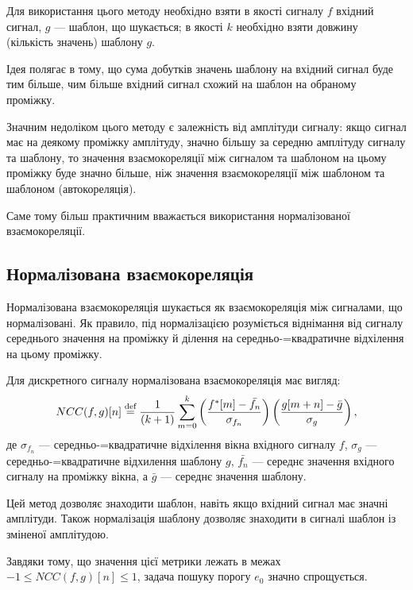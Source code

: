         Для використання цього методу необхідно взяти в якості сигналу $f$ вхідний сигнал, $g$ --- шаблон, що
        шукається; в якості $k$ необхідно взяти довжину (кількість значень) шаблону $g$.

        Ідея полягає в тому, що сума добутків значень шаблону на вхідний сигнал буде тим більше, чим більше вхідний
        сигнал схожий на шаблон на обраному проміжку.

        Значним недоліком цього методу є залежність від амплітуди сигналу: якщо сигнал має на деякому проміжку
        амплітуду, значно більшу за середню амплітуду сигналу та шаблону, то значення взаємокореляції між сигналом та
        шаблоном на цьому проміжку буде значно більше, ніж значення взаємокореляції між шаблоном та шаблоном
        (автокореляція).

        Саме тому більш практичним вважається використання нормалізованої взаємокореляції.
    \subsection{Нормалізована взаємокореляція}
        Нормалізована взаємокореляція шукається як взаємокореляція між сигналами, що нормалізовані.
        Як правило, під нормалізацією розуміється віднімання від сигналу середнього значення на проміжку й ділення на
        середньо-=квадратичне відхілення на цьому проміжку.

        Для дискретного сигналу нормалізована взаємокореляція має вигляд:
        \begin{equation}
            NCC(f,g)[ n ] \stackrel{\text{def}}{=} \frac{1}{\left(k+1\right)} \sum\limits_{m=0}^{k} \left(\frac{f^*[m] -\bar{f_n}}{\sigma_{f_n}}\right) \left(\frac{g[ m + n ]-\bar{g}}{\sigma_g}\right),
        \end{equation}
        де $\sigma_{f_n}$ --- середньо-=квадратичне відхілення вікна вхідного сигналу $f$, $\sigma_g$ ---
        середньо-=квадратичне відхилення шаблону $g$, $\bar{f_n}$ --- середнє значення вхідного сигналу на проміжку
        вікна, а $\bar{g}$ --- середнє значення шаблону.

        Цей метод дозволяє знаходити шаблон, навіть якщо вхідний сигнал має значні  амплітуди.
        Також нормалізація шаблону дозволяє знаходити в сигналі шаблон із зміненої амплітудою.

        Завдяки тому, що значення цієї метрики лежать в межах $-1 \leqslant NCC( f, g )[ n ] \leqslant 1$, задача
        пошуку порогу $e_0$ значно спрощується.

